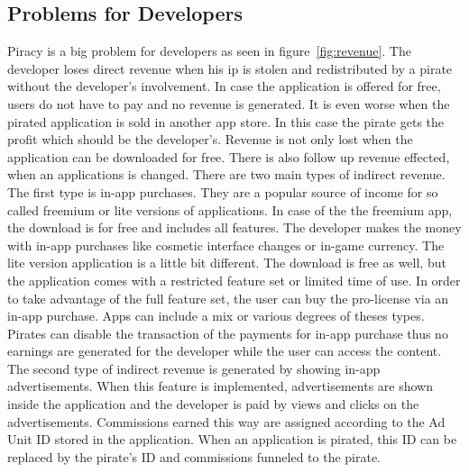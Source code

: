\subsection{Problems for Developers} \label{subsection:foundation-piracy-developers}
Piracy is a big problem for developers as seen in figure~\ref{fig:revenue}.
The developer loses direct revenue when his \gls{ip} is stolen and redistributed by a pirate without the developer's involvement.
In case the application is offered for free, users do not have to pay and no revenue is generated.
It is even worse when the pirated application is sold in another app store.
In this case the pirate gets the profit which should be the developer's.
\newline
Revenue is not only lost when the application can be downloaded for free.
There is also follow up revenue effected, when an applications is changed.
There are two main types of indirect revenue.
\newline
The first type is in-app purchases.
They are a popular source of income for so called freemium or lite versions of applications.
In case of the the freemium app, the download is for free and includes all features.
The developer makes the money with in-app purchases like cosmetic interface changes or in-game currency.
The lite version application is a little bit different.
The download is free as well, but the application comes with a restricted feature set or limited time of use.
In order to take advantage of the full feature set, the user can buy the pro-license via an in-app purchase.
\newline
Apps can include a mix or various degrees of theses types.
Pirates can disable the transaction of the payments for in-app purchase thus no earnings are generated for the developer while the user can access the content.
\newline
The second type of indirect revenue is generated by showing in-app advertisements.
When this feature is implemented, advertisements are shown inside the application and the developer is paid by views and clicks on the advertisements.
Commissions earned this way are assigned according to the Ad Unit ID \cite{googleAdmob} stored in the application.
When an application is pirated, this ID can be replaced by the pirate's ID and commissions funneled to the pirate.
\newline
